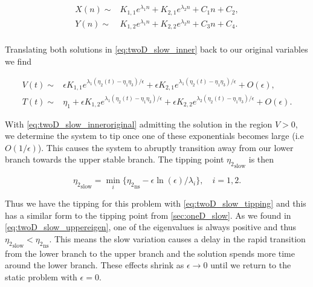 \begin{equation}\label{eq:twoD_slow_innersoln}
\begin{aligned}
X(n)\sim& K_{1,1}e^{\lambda_1 n}+K_{2,1}e^{\lambda_2 n}+C_1 n+C_2,\\
Y(n)\sim& K_{1,2}e^{\lambda_1 n}+K_{2,2}e^{\lambda_2 n}+C_3 n+C_4.\\
\end{aligned}
\end{equation}

Translating both solutions in \eqref{eq:twoD_slow_inner} back to our original variables we find

\begin{equation}\label{eq:twoD_slow_inneroriginal}
\begin{aligned}
V(t)\sim& \epsilon K_{1,1}e^{\lambda_1(\eta_2(t)-\eta_1\eta_3)/\epsilon}+\epsilon K_{2,1}e^{\lambda_1(\eta_2(t)-\eta_1\eta_3)/\epsilon}+O(\epsilon),\\
T(t)\sim& \eta_1+ \epsilon K_{1,2}e^{\lambda_1 (\eta_2(t)-\eta_1\eta_3)/\epsilon}+\epsilon K_{2,2}e^{\lambda_2 (\eta_2(t)-\eta_1\eta_3)/\epsilon}+O(\epsilon).
\end{aligned}
\end{equation}

\indent With \eqref{eq:twoD_slow_inneroriginal} admitting the solution in the region $V>0$, we determine the system to tip once one of these exponentials becomes large (i.e $O(1/\epsilon)$). This causes the system to abruptly transition away from our lower branch towards the upper stable branch. The tipping point ${\eta_2}_{\text{slow}}$ is then

\begin{equation}\label{eq:twoD_slow_tipping}
{\eta_2}_{\text{slow}}= \min\limits_i\{{\eta_2}_{\text{ns}}-\epsilon\ln(\epsilon)/\lambda_i\},\quad i=1,2.
\end{equation}

Thus we have the tipping for this problem with \eqref{eq:twoD_slow_tipping} and this has a similar form to the tipping point from \autoref{sec:oneD_slow}. As we found in \eqref{eq:twoD_slow_uppereigen}, one of the eigenvalues is always positive and thus ${\eta_2}_{\text{slow}}<{\eta_2}_{\text{ns}}$. This means the slow variation causes a delay in the rapid transition from the lower branch to the upper branch and the solution spends more time around the lower branch. These effects shrink as $\epsilon\to 0$ until we return to the static problem with $\epsilon=0$.

